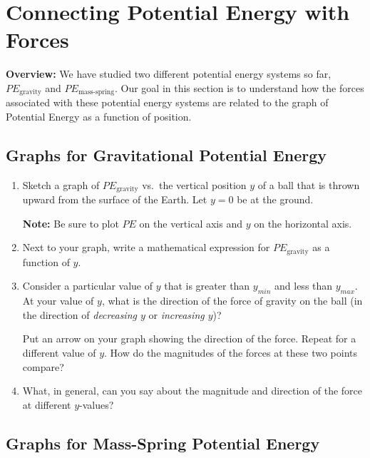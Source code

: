 \section{Connecting Potential Energy with Forces}
\label{act2.4.1}

\begin{overview}

\textbf{Overview:} We have studied two different potential energy systems so far,  $PE_\text{gravity}$ and $PE_\text{mass-spring}$. Our goal in this section is to understand how the forces associated with these potential energy systems are related to the graph of Potential Energy as a function of position.

\end{overview}

\subsection{Graphs for Gravitational Potential Energy}
\label{act2.4.1-1}

\begin{enumerate}
	\item Sketch a graph of $PE_\text{gravity}$ vs.\ the vertical position $y$ of a ball that is thrown upward from the surface of the Earth. Let $y = 0$ be at the ground.
	
		\textbf{Note:} Be sure to plot $PE$ on the vertical axis and $y$ on the horizontal axis.
	
	\item Next to your graph, write a mathematical expression for $PE_\text{gravity}$ as a function of $y$.
	
	\item Consider a particular value of $y$ that is greater than $y_{min}$ and less than $y_{max}$. At your value of $y$, what is the direction of the force of gravity on the ball (in the direction of \emph{decreasing $y$} or \emph{increasing $y$})?
	
		Put an arrow on your graph showing the direction of the force. Repeat for a different value of $y$. How do the magnitudes of the forces at these two points compare?
	
	\item What, in general, can you say about the magnitude and direction of the force at different $y$-values?
\end{enumerate}

\subsection{Graphs for Mass-Spring Potential Energy}
\label{act2.4.1-2}

